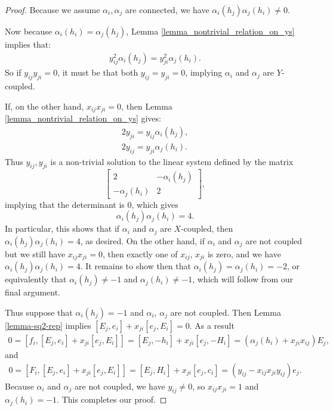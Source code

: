 \documentclass[12pt, a4paper, reqno]{amsart}
\theoremstyle{definition}
\theoremstyle{definition}
\theoremstyle{definition}
\numberwithin{theorem}{section}
\numberwithin{lemma}{section}
\numberwithin{remark}{section}
\numberwithin{definition}{section}
\numberwithin{corollary}{section}
\numberwithin{proposition}{section}
\numberwithin{example}{section}
\begin{document}
	\begin{proof}
		Because we assume $\alpha_i,\alpha_j$ are connected, we have $\alpha_i(h_j)\alpha_j(h_i)\neq0$.  
		
		Now because $\alpha_i(h_i)=\alpha_j(h_j)$, Lemma \ref{lemma_nontrivial_relation_on_ys} implies that:
		\begin{align}
			y_{ij}^2\alpha_i(h_j) = y_{ji}^2\alpha_j(h_i).
		\end{align}
		So if \(y_{ij}y_{ji} = 0\), it must be that both \(y_{ij}=y_{ji} = 0\), implying \(\alpha_i\) and \(\alpha_j\) are $Y$-coupled.
		
		If, on the other hand, \(x_{ij}x_{ji} = 0\), then Lemma \ref{lemma_nontrivial_relation_on_ys} gives:
		\begin{align*}
			2y_{ji} = y_{ij}\alpha_i(h_j), \\
			2y_{ij} = y_{ji}\alpha_j(h_i).
		\end{align*}
		Thus \(y_{ij},y_{ji}\) is a non-trivial solution to the linear system defined by the matrix 
		\[
		\begin{bmatrix} 2 & -\alpha_i(h_j)\\ -\alpha_j(h_i) & 2\end{bmatrix},
		\]
		implying that the determinant is 0, which gives
		\[
		\alpha_i(h_j)\alpha_j(h_i) = 4.
		\]
		In particular, this shows that if $\alpha_i$ and $\alpha_j$ are $X$-coupled, then $\alpha_i(h_j)\alpha_j(h_i)=4$, as desired. On the other hand, if \(\alpha_i\) and \(\alpha_j\) are not coupled but we still have $x_{ij}x_{ji}=0$, then exactly one of \(x_{ij}\), \(x_{ji}\) is zero, and we have $\alpha_i(h_j)\alpha_j(h_i)=4$.  It remains to show then that $\alpha_i(h_j)=\alpha_j(h_i)=-2$, or equivalently that $\alpha_i(h_j)\neq-1$ and $\alpha_j(h_i)\neq-1$, which will follow from our final argument.
		
		Thus suppose that \(\alpha_i(h_j) = -1\) and \(\alpha_i\), \(\alpha_j\) are not coupled. Then Lemma \ref{lemma-sq2-rep} implies \([E_j,e_i] + x_{ji}[e_j,E_i] = 0\). As a result
		\begin{align*}
			0 = [f_i,[E_j,e_i] + x_{ji}[e_j,E_i]] = [E_j,-h_i]+ x_{ji}[e_j,-H_i] = (\alpha_j(h_i)+x_{ji}x_{ij})E_j,
		\end{align*}
		and
		\begin{align*}
			0 = [F_i,[E_j,e_i] + x_{ji}[e_j,E_i]] = [E_j,H_i] + x_{ji}[e_j,c_i] = (y_{ij}-x_{ij}x_{ji}y_{ij})e_j.
		\end{align*}
		Because \(\alpha_i\) and \(\alpha_j\) are not coupled, we have \(y_{ij} \neq 0\), so \(x_{ij}x_{ji}=1\) and \(\alpha_j(h_i) = -1\).  This completes our proof.
	\end{proof}
	
\end{document}
